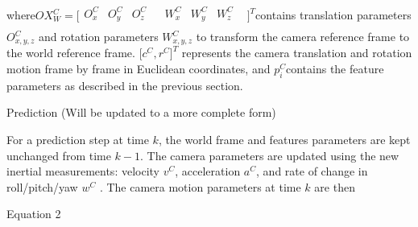 where$OX_{W}^{C}=\lbrack \begin{matrix}
O_{x}^{C} & O_{y}^{C} & O_{z}^{C} & \\
\end{matrix}
\begin{matrix}
W_{x}^{C} & W_{y}^{C} & W_{z}^{C} & \\
\end{matrix}
\rbrack ^{T}$contains translation parameters $O_{x,y,z}^{C}$ and 
rotation parameters $W_{x,y,z}^{C}$ to transform the camera reference 
frame to the world reference frame. $\lbrack c^{C},r^{C}\rbrack ^{T}$
represents the camera translation and rotation motion frame by frame in 
Euclidean coordinates, and $p_{i}^{C}$contains the feature parameters 
as described in the previous section. 

Prediction (Will be updated to a more complete form)

For a prediction step at time $k$, the world frame and features 
parameters are kept unchanged from time $k-1$. The camera parameters 
are updated using the new inertial measurements: velocity $v^{C}$, 
acceleration $a^{C}$, and rate of change in roll/pitch/yaw $w^{C}$
. The camera motion parameters at time $k$ are then

Equation 2



